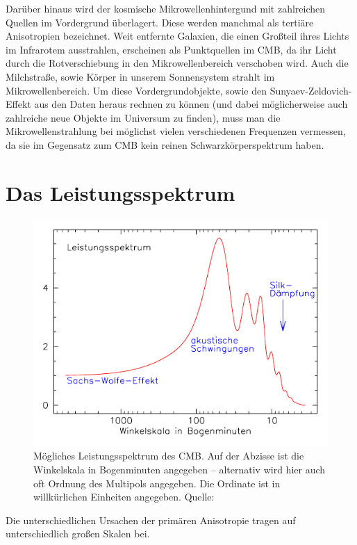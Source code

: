 \documentclass[10pt,a4paper]{article}
\begin{document}
Darüber hinaus wird der kosmische Mikrowellenhintergund mit zahlreichen Quellen im Vordergrund überlagert. Diese werden manchmal als tertiäre Anisotropien bezeichnet.
Weit entfernte Galaxien, die einen Großteil ihres Lichts im Infrarotem ausstrahlen, erscheinen als Punktquellen im CMB, da ihr Licht durch die Rotverschiebung in den Mikrowellenbereich verschoben wird. Auch die Milchstraße, sowie Körper in unserem Sonnensystem strahlt im Mikrowellenbereich.
Um diese Vordergrundobjekte, sowie den Sunyaev-Zeldovich-Effekt aus den Daten heraus rechnen zu können (und dabei möglicherweise auch zahlreiche neue Objekte im Universum zu finden), muss man die Mikrowellenstrahlung bei möglichst vielen verschiedenen Frequenzen vermessen, da sie im Gegensatz zum CMB kein reinen Schwarzkörperspektrum haben.\cite{A+R}

\section{Das Leistungsspektrum}
\begin{figure}
\center
\includegraphics[scale=1]{pow}
\caption{Mögliches Leistungsspektrum des CMB. Auf der Abzisse ist die Winkelskala in Bogenminuten angegeben -- alternativ wird hier auch oft Ordnung des Multipols angegeben. Die Ordinate ist in willkürlichen Einheiten angegeben. Quelle: \cite{A+R}}
\label{pow}
\end{figure}
Die unterschiedlichen Ursachen der primären Anisotropie tragen auf unterschiedlich großen Skalen bei.
\end{document}
